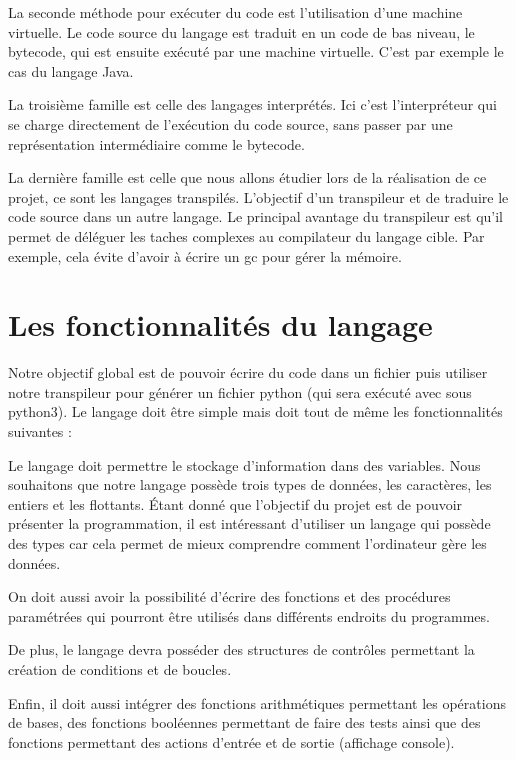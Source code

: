 \documentclass[a4paper]{article}%
\begin{document}
La seconde méthode pour exécuter du code est l'utilisation d'une machine
virtuelle. Le code source du langage est traduit en un code de bas niveau, le
\gls{bytecode}, qui est ensuite exécuté par une machine virtuelle. C'est par exemple
le cas du langage Java.

La troisième famille est celle des langages interprétés. Ici c'est
l'interpréteur qui se charge directement de l'exécution du code source, sans
passer par une représentation intermédiaire comme le \gls{bytecode}.

La dernière famille est celle que nous allons étudier lors de la réalisation de
ce projet, ce sont les langages transpilés. L'objectif d'un transpileur et de
traduire le code source dans un autre langage. Le principal avantage du
transpileur est qu'il permet de déléguer les taches complexes au compilateur du
langage cible. Par exemple, cela évite d'avoir à écrire un \gls{gc} pour gérer
la mémoire.

\section{Les fonctionnalités du langage}

Notre objectif global est de pouvoir écrire du code dans un fichier puis
utiliser notre transpileur pour générer un fichier python (qui sera exécuté avec
sous python3). Le langage doit être simple mais doit tout de même les
fonctionnalités suivantes :

Le langage doit permettre le stockage d'information dans des variables. Nous
souhaitons que notre langage possède trois types de données, les caractères, les
entiers et les flottants. Étant donné que l'objectif du projet est de pouvoir
présenter la programmation, il est intéressant d'utiliser un langage qui possède
des types car cela permet de mieux comprendre comment l'ordinateur gère les
données.

On doit aussi avoir la possibilité d'écrire des fonctions et des procédures
paramétrées qui pourront être utilisés dans différents endroits du programmes.

De plus, le langage devra posséder des structures de contrôles permettant la
création de conditions et de boucles.

Enfin, il doit aussi intégrer des fonctions arithmétiques permettant les
opérations de bases, des fonctions booléennes permettant de faire des
tests ainsi que des fonctions permettant des actions d'entrée et de sortie
(affichage console).
\end{document}
